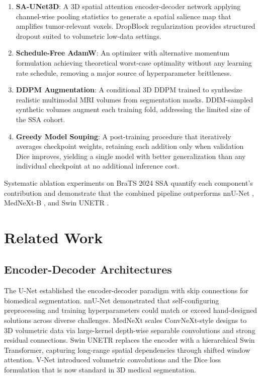 \documentclass[conference]{IEEEtran}
\begin{document}
\begin{enumerate}
  \item \textbf{SA-UNet3D}: A 3D spatial attention
  encoder-decoder network applying channel-wise pooling statistics
  to generate a spatial salience map that amplifies tumor-relevant
  voxels. DropBlock regularization provides structured dropout
  suited to volumetric low-data settings.

  \item \textbf{Schedule-Free AdamW}: An optimizer with
  alternative momentum formulation \cite{b6} achieving theoretical
  worst-case optimality without any learning rate schedule,
  removing a major source of hyperparameter brittleness.

  \item \textbf{DDPM Augmentation}: A conditional 3D DDPM trained
  to synthesize realistic multimodal MRI volumes from segmentation
  masks. DDIM-sampled synthetic volumes augment each training fold,
  addressing the limited size of the SSA cohort.

  \item \textbf{Greedy Model Souping}: A post-training procedure
  that iteratively averages checkpoint weights, retaining each
  addition only when validation Dice improves, yielding a single
  model with better generalization than any individual checkpoint
  at no additional inference cost.
\end{enumerate}

Systematic ablation experiments on BraTS 2024 SSA quantify each
component's contribution and demonstrate that the combined pipeline
outperforms nnU-Net \cite{b2}, MedNeXt-B \cite{b3},
and Swin UNETR \cite{b4}.

\section{Related Work}

\subsection{Encoder-Decoder Architectures}

The U-Net \cite{b5} established the encoder-decoder paradigm with
skip connections for biomedical segmentation. nnU-Net \cite{b2}
demonstrated that self-configuring preprocessing and training
hyperparameters could match or exceed hand-designed solutions
across diverse challenges. MedNeXt \cite{b3} scales ConvNeXt-style
designs to 3D volumetric data via large-kernel depth-wise separable
convolutions and strong residual connections. Swin UNETR \cite{b4}
replaces the encoder with a hierarchical Swin Transformer,
capturing long-range spatial dependencies through shifted window
attention. V-Net \cite{b17} introduced volumetric convolutions and
the Dice loss formulation that is now standard in 3D medical
segmentation.
\end{document}
